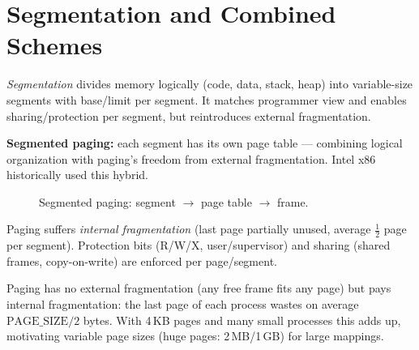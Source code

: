\section{Segmentation and Combined Schemes}
\label{sec:segmentation}

\emph{Segmentation} divides memory logically (code, data, stack, heap) into
variable-size segments with base/limit per segment. It matches programmer
view and enables sharing/protection per segment, but reintroduces external
fragmentation.

\textbf{Segmented paging:} each segment has its own page table --- combining
logical organization with paging's freedom from external fragmentation. Intel
x86 historically used this hybrid.

\begin{figure}[h!]
\centering
{}
\caption{Segmented paging: segment $\to$ page table $\to$ frame.}
\label{fig:segpage}
\end{figure}

Paging suffers \emph{internal fragmentation} (last page partially unused,
average $\frac{1}{2}$ page per segment). Protection bits (R/W/X, user/supervisor)
and sharing (shared frames, copy-on-write) are enforced per page/segment.

\begin{remark}
Paging has no external fragmentation (any free frame fits any page) but pays
internal fragmentation: the last page of each process wastes on average
$\text{PAGE\_SIZE}/2$ bytes. With 4\,KB pages and many small processes this
adds up, motivating variable page sizes (huge pages: 2\,MB/1\,GB) for
large mappings.
\end{remark}

